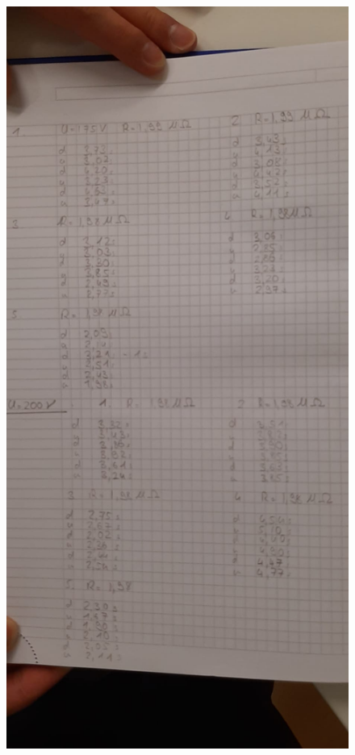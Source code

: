 \begin{figure}[H]
    \centering
    \includegraphics[width=\textwidth]{messdaten/U175&U200.jpeg}
\end{figure}

